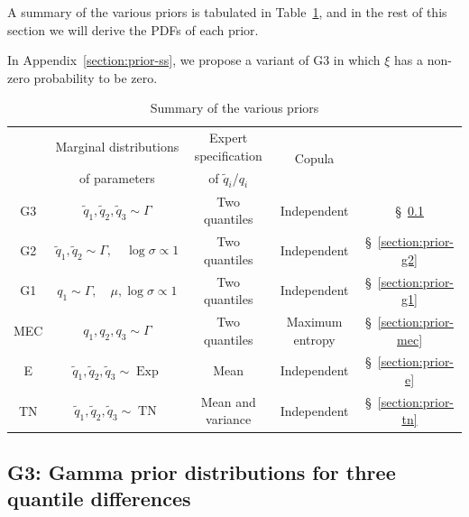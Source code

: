 \documentclass{article}
\begin{document}
%
A summary of the various priors is tabulated in Table~\ref{table:prior-summary},
and in the rest of this section we will derive the PDFs of each prior.
%

%
In Appendix~\ref{section:prior-ss}, we propose a variant of G3 in which
$\xi$ has a non-zero probability to be zero.
%
\begin{table}
	\centering
	\renewcommand{\arraystretch}{1.2}
	\begin{tabular}{@{}ccccc@{}}
		\toprule[0.1em]
		&Marginal distributions &Expert specification
			&\multirow{2}{*}{Copula} & \\
		&of parameters &of $\tilde{q}_i$/$q_i$ & &\\
		\midrule[0.1em]
		G3
			&$\tilde{q}_1, \tilde{q}_2, \tilde{q}_3 \sim \Gamma$
			&Two quantiles
			&Independent
			&\S~\ref{section:prior-g3} \\
		G2
			&$\tilde{q}_1, \tilde{q}_2 \sim \Gamma, \quad \log\sigma \propto 1$
			&Two quantiles
			&Independent
			&\S~\ref{section:prior-g2}\\
		G1
			&$q_1 \sim \Gamma, \quad \mu, \log\sigma \propto 1$
			&Two quantiles
			&Independent
			&\S~\ref{section:prior-g1}\\
		MEC
			&$q_1, q_2, q_3 \sim \Gamma$
			&Two quantiles
			&Maximum entropy
			&\S~\ref{section:prior-mec}\\
		E
			&$\tilde{q}_1, \tilde{q}_2, \tilde{q}_3 \sim \operatorname{Exp}$
			&Mean
			&Independent
			&\S~\ref{section:prior-e}\\
		TN
			&$\tilde{q}_1, \tilde{q}_2, \tilde{q}_3 \sim \operatorname{TN}$
			&Mean and variance
			&Independent
			&\S~\ref{section:prior-tn}\\
		\bottomrule[0.1em]
	\end{tabular}
	\caption{Summary of the various priors}
	\label{table:prior-summary}
\end{table}
%
\subsection{G3: Gamma prior distributions for three quantile differences}
\label{section:prior-g3}
%
\end{document}
